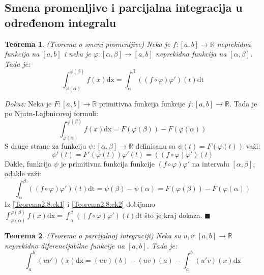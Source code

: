 \documentclass{article}
\newtheorem{teorema}{Teorema}[section]
\begin{document}
\subsection{Smena promenljive i parcijalna integracija u određenom integralu}
\begin{teoremabox}
    \begin{teorema}
        (Teorema o smeni promenljive) Neka je $f:[a, b]\longrightarrow \mathbb{R}$ neprekidna funkcija na $[a,b]$ i neka je $\varphi: [\alpha, \beta] \longrightarrow [a, b]$ neprekidna funkcija na $[\alpha, \beta]$. Tada je:
        $$\displaystyle \int^{\varphi(\beta)}_{\varphi(\alpha)} f(x)\text{dx} = \int^\beta_\alpha ((f\circ\varphi)\varphi')(t)\text{dt}$$
    \end{teorema}
\end{teoremabox}
\textit{Dokaz:} Neka je $F:[a,b]\longrightarrow \mathbb{R}$ primitivna funkcija funkcije $f:[a,b]\longrightarrow\mathbb{R}$. Tada je po Njutn-Lajbnicovoj formuli:
\begin{equation}
    \displaystyle\int^{\varphi(\beta)}_{\varphi(\alpha)}f(x)\text{dx} = F(\varphi(\beta))-F(\varphi(\alpha))
    \label{Teorema2.8:ek1}
\end{equation}
S druge strane za funkciju $\psi:[\alpha,\beta]\longrightarrow\mathbb{R}$ definisanu sa $\psi(t) = F(\varphi(t))$ važi:
\begin{equation*}
    \psi'(t) = F'(\varphi(t))\varphi'(t) = ((f\circ\varphi)\varphi')(t)
\end{equation*}
Dakle, funkcija $\psi$ je primitivna funkcija funkcije $(f\circ\varphi)\varphi'$ na intervalu $[\alpha,\beta]$, odakle važi:
\begin{equation}
    \displaystyle\int^\beta_\alpha ((f\circ\varphi)\varphi')(t)\text{dt} = \psi(\beta) - \psi(\alpha) = F(\varphi(\beta)) - F(\varphi(\alpha))
    \label{Teorema2.8:ek2}
\end{equation}
Iz \eqref{Teorema2.8:ek1} i \eqref{Teorema2.8:ek2} dobijamo $\displaystyle\int^{\varphi(\beta)}_{\varphi(\alpha)} f(x)\text{dx} = \int^\beta_\alpha ((f\circ\varphi)\varphi')(t)\text{dt}$ što je kraj dokaza.
\null\hfill $\blacksquare$\par
\begin{teoremabox}
    \begin{teorema}
        (Teorema o parcijalnoj integraciji) Neka su $u, v: [a, b] \longrightarrow\mathbb{R}$ neprekidno diferencijabilne funkcije na $[a,b]$. Tada je:
        $$\displaystyle\int^b_a(uv')(x)\text{dx} = (uv)(b) - (uv)(a) - \int^b_a(u'v)(x)\text{dx}$$
    \end{teorema}
\end{teoremabox}
\end{document}
